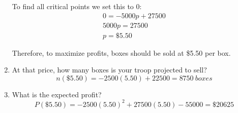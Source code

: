 \documentclass[letterpaper,12pt,fleqn]{article}
\begin{document}
\begin{enumerate}
  To find all critical points we set this to 0:
  \begin{gather*}
    0=-5000p+27500 \\
    5000p=27500 \\
    p=\$5.50
  \end{gather*}

  Therefore, to maximize profits, boxes should be sold at \$5.50 per box.
  
\item At that price, how many boxes is your troop projected to sell?
  \[n(\$5.50)=-2500(5.50)+22500=\SI{8750}{boxes}\]
  
\item What is the expected profit?
  \[P(\$5.50)=-2500(5.50)^2+27500(5.50)-55000=\$20625\]
\end{enumerate}
\end{document}
